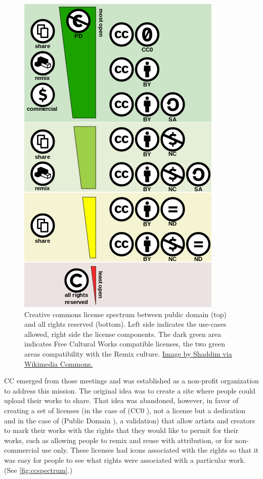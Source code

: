 \begin{figure}[h]
 \centering
 \includegraphics[width=.5\textwidth]{pictures/Creative_commons_license_spectrum}
 \caption[Creative commons license spectrum between public domain and all rights reserved.]{Creative commons license spectrum between public domain (top) and all rights reserved (bottom). Left side indicates the use-cases allowed, right side the license components. The dark green area indicates Free Cultural Works compatible licenses, the two green areas compatibility with the Remix culture. \href{https://commons.wikimedia.org/wiki/File:Creative_commons_license_spectrum.svg}{Image by Shaddim via Wikimedia Commons.}}
 \label{fig:ccspectrum}
\end{figure}

\ac{CC} emerged from those meetings and was established as a non-profit organization to address this mission. The original idea was to create a site where people could upload their works to share. That idea was abandoned, however, in favor of creating a set of licenses (in the case of (CC0 \ccZero), not a license but a dedication and in the case of (Public Domain \ccPublicDomain), a validation) that allow artists and creators to mark their works with the rights that they would like to permit for their works, such as allowing people to remix and reuse with attribution, or for non-commercial use only. These licenses had icons associated with the rights so that it was easy for people to see what rights were associated with a particular work. (See \autoref{fig:ccspectrum}.)

